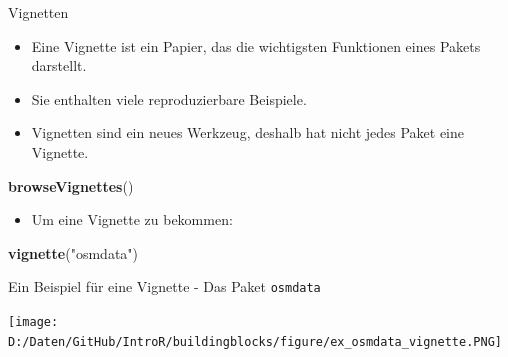 \documentclass[ignorenonframetext,]{beamer}
\newenvironment{Shaded}{\begin{snugshade}}{\end{snugshade}}
\newcommand{\KeywordTok}[1]{\textcolor[rgb]{0.26,0.66,0.93}{\textbf{#1}}}
\newcommand{\StringTok}[1]{\textcolor[rgb]{0.02,0.61,0.04}{#1}}
\newcommand{\NormalTok}[1]{\textcolor[rgb]{0.74,0.68,0.62}{#1}}
\providecommand{\tightlist}{%
  \setlength{\itemsep}{0pt}\setlength{\parskip}{0pt}}
\begin{document}
\begin{frame}[fragile]{Vignetten}

\begin{itemize}
\tightlist
\item
  Eine Vignette ist ein Papier, das die wichtigsten Funktionen eines
  Pakets darstellt.
\item
  Sie enthalten viele reproduzierbare Beispiele.
\item
  Vignetten sind ein neues Werkzeug, deshalb hat nicht jedes Paket eine
  Vignette.
\end{itemize}

\begin{Shaded}
\begin{Highlighting}[]
\KeywordTok{browseVignettes}\NormalTok{()}
\end{Highlighting}
\end{Shaded}

\begin{itemize}
\tightlist
\item
  Um eine Vignette zu bekommen:
\end{itemize}

\begin{Shaded}
\begin{Highlighting}[]
\KeywordTok{vignette}\NormalTok{(}\StringTok{"osmdata"}\NormalTok{)}
\end{Highlighting}
\end{Shaded}

\end{frame}

\begin{frame}{Ein Beispiel für eine Vignette - Das Paket
\texttt{osmdata}}

\texttt{[image: D:/Daten/GitHub/IntroR/buildingblocks/figure/ex\_osmdata\_vignette.PNG]}

\end{frame}
\end{document}
